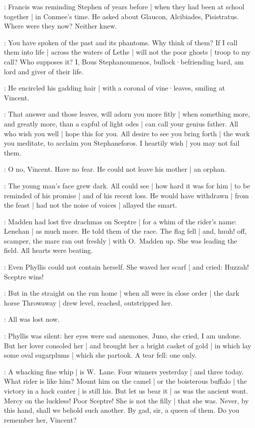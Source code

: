 

:
Francis was reminding Stephen of years before |
when they had been at school together |
in Conmee's time.
He asked about Glaucon,
Alcibiades,
Pisistratus.
Where were they now?
Neither knew.

\stephen:
You have spoken of the past and its phantoms.
Why think of them?
If I call them into life |
across the waters of Lethe |
will not the poor ghosts |
troop to my call?
Who supposes it?
I,
Bous Stephanoumenos,
bullock·befriending bard,
am lord and giver of their life.

:
He encircled his gadding hair |
with a coronal of vine·leaves,
smiling at Vincent.

\lynch:
That answer and those leaves,
will adorn you more fitly |
when something more,
and greatly more,
than a capful of light odes |
can call your genius father.
All who wish you well |
hope this for you.
All desire to see you bring forth |
the work you meditate,
to acclaim you Stephaneforos.
I heartily wish |
you may not fail them.

\lenehan:
O no,
Vincent.
Have no fear.
He could not leave his mother |
an orphan.

:
The young man's face grew dark.
All could see |
how hard it was for him |
to be reminded of his promise |
and of his recent loss.
He would have withdrawn |
from the feast |
had not the noise of voices |
allayed the smart.

:
Madden had lost five drachmas on Sceptre |
for a whim of the rider's name:
Lenehan |
as much more.
He told them of the race.
The flag fell |
and,
huuh!
off,
scamper,
the mare ran out freshly |
with O.~Madden up.
She was leading the field.
All hearts were beating.%

:
Even Phyllis could not contain herself.
She waved her scarf |
and cried:
Huzzah!
Sceptre wins!

:
But in the straight on the run home |
when all were in close order |
the dark horse Throwaway |
drew level,
reached,
outstripped her.

:
All was lost now.

:
Phyllis was silent:
her eyes were sad anemones.
Juno,
she cried,
I am undone.
But her lover consoled her |
and brought her a bright casket of gold |
in which lay some oval sugarplums |
which she partook.
A tear fell:
one only.

\lenehan:
A whacking fine whip |
is W.~Lane.
Four winners yesterday |
and three today.
What rider is like him?
Mount him on the camel |
or the boisterous buffalo |
the victory in a hack canter |
is still his.
But let us bear it |
as was the ancient wont.
Mercy on the luckless!
Poor Sceptre!
She is not the filly |
that she was.
Never,
by this hand,
shall we behold such another.
By gad,
sir,
a queen of them.
Do you remember her,
Vincent?

